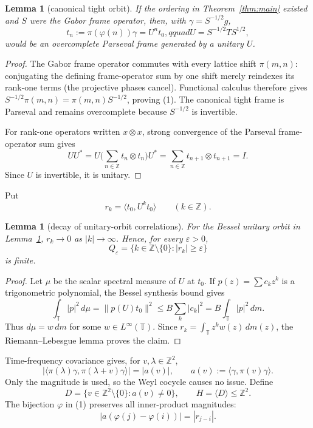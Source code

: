 \documentclass[11pt]{article}
\newtheorem{lemma}[theorem]{Lemma}
\newcommand{\Z}{\mathbb Z}
\newcommand{\T}{\mathbb T}
\begin{document}
\begin{lemma}[canonical tight orbit]\label{lem:tight}
If the ordering in Theorem~\ref{thm:main} existed and $S$ were the Gabor frame
operator, then, with $\gamma=S^{-1/2}g$,
\[
 t_n:=\pi(\varphi(n))\gamma=U^nt_0,qquad
 U=S^{-1/2}TS^{1/2},                                   \tag{1}
\]
would be an overcomplete Parseval frame generated by a unitary $U$.
\end{lemma}

\begin{proof}
The Gabor frame operator commutes with every lattice shift $\pi(m,n)$: conjugating
the defining frame-operator sum by one shift merely reindexes its rank-one
terms (the projective phases cancel).  Functional calculus therefore gives
$S^{-1/2}\pi(m,n)=\pi(m,n)S^{-1/2}$, proving (1).  The canonical tight frame
is Parseval and remains overcomplete because $S^{-1/2}$ is invertible.

For rank-one operators written $x\otimes x$, strong convergence of the
Parseval frame-operator sum gives
\[
 UU^*=U\Big(\sum_{n\in\Z}t_n\otimes t_n\Big)U^*
      =\sum_{n\in\Z}t_{n+1}\otimes t_{n+1}=I.
\]
Since $U$ is invertible, it is unitary.
\end{proof}

Put
\[
 r_k=\langle t_0,U^kt_0\rangle\qquad(k\in\Z).
\]

\begin{lemma}[decay of unitary-orbit correlations]\label{lem:decay}
For the Bessel unitary orbit in Lemma~\ref{lem:tight}, $r_k\to0$ as
$|k|\to\infty$.  Hence, for every $\varepsilon>0$,
\[
 Q_\varepsilon=\{k\in\Z\setminus\{0\}:|r_k|\ge\varepsilon\}
                                                               \tag{2}
\]
is finite.
\end{lemma}

\begin{proof}
Let $\mu$ be the scalar spectral measure of $U$ at $t_0$.  If
$p(z)=\sum c_kz^k$ is a trigonometric polynomial, the Bessel synthesis bound
gives
\[
 \int_\T|p|^2\,d\mu=\|p(U)t_0\|^2
 \le B\sum_k|c_k|^2=B\int_\T|p|^2\,dm.
\]
Thus $d\mu=w\,dm$ for some $w\in L^\infty(\T)$.  Since
$r_k=\int_\T z^k w(z)\,dm(z)$, the Riemann--Lebesgue lemma proves the claim.
\end{proof}

Time-frequency covariance gives, for $v,\lambda\in\Z^2$,
\[
 |\langle\pi(\lambda)\gamma,\pi(\lambda+v)\gamma\rangle|
 =|a(v)|,
 \qquad a(v):=\langle\gamma,\pi(v)\gamma\rangle.       \tag{3}
\]
Only the magnitude is used, so the Weyl cocycle causes no issue.  Define
\[
 D=\{v\in\Z^2\setminus\{0\}:a(v)\ne0\},\qquad H=\langle D\rangle\le\Z^2.
                                                               \tag{4}
\]
The bijection $\varphi$ in (1) preserves all inner-product magnitudes:
\[
 |a(\varphi(j)-\varphi(i))|=|r_{j-i}|.                \tag{5}
\]
\end{document}
